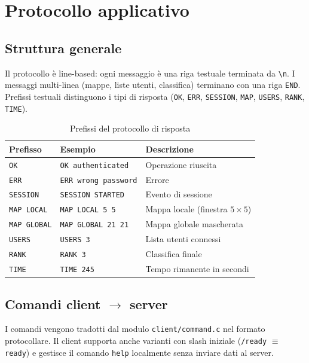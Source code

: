 \documentclass[a4paper,11pt]{article}
\begin{document}
\section{Protocollo applicativo}

\subsection{Struttura generale}

Il protocollo è line-based: ogni messaggio è una riga testuale terminata da
\texttt{\textbackslash n}. I messaggi multi-linea (mappe, liste utenti, classifica)
terminano con una riga \texttt{END}. Prefissi testuali distinguono i tipi di risposta
(\texttt{OK}, \texttt{ERR}, \texttt{SESSION}, \texttt{MAP}, \texttt{USERS},
\texttt{RANK}, \texttt{TIME}).

\begin{table}[h]
\centering
\begin{tabular}{l|l|l}
\textbf{Prefisso} & \textbf{Esempio} & \textbf{Descrizione} \\
\hline
\texttt{OK} & \texttt{OK authenticated} & Operazione riuscita \\
\texttt{ERR} & \texttt{ERR wrong password} & Errore \\
\texttt{SESSION} & \texttt{SESSION STARTED} & Evento di sessione \\
\texttt{MAP LOCAL} & \texttt{MAP LOCAL 5 5} & Mappa locale (finestra $5\times5$) \\
\texttt{MAP GLOBAL} & \texttt{MAP GLOBAL 21 21} & Mappa globale mascherata \\
\texttt{USERS} & \texttt{USERS 3} & Lista utenti connessi \\
\texttt{RANK} & \texttt{RANK 3} & Classifica finale \\
\texttt{TIME} & \texttt{TIME 245} & Tempo rimanente in secondi \\
\end{tabular}
\caption{Prefissi del protocollo di risposta}
\end{table}

\subsection{Comandi client $\to$ server}

I comandi vengono tradotti dal modulo \texttt{client/command.c} nel formato
protocollare. Il client supporta anche varianti con slash iniziale
(\texttt{/ready} $\equiv$ \texttt{ready}) e gestisce il comando \texttt{help}
localmente senza inviare dati al server.
\end{document}
